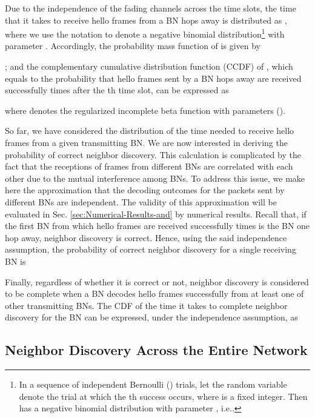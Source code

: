\documentclass[10pt,english,two column]{IEEEtran}
\begin{document}
Due to the independence of the fading channels across the time slots,
the time  that it takes to receive  hello frames from
a BN  hops away is distributed as ,
where we use the notation  to denote a negative binomial
distribution\footnote{In a sequence of independent Bernoulli () trials, let the random
variable  denote the trial at which the th success occurs,
where  is a fixed integer. Then  has a negative binomial distribution
\cite{Morris} with parameter , i.e.. } with parameter . Accordingly, the probability mass function
of  is given by \cite{Morris} 

; and the complementary cumulative
distribution function (CCDF) of , which equals to the probability
that hello frames sent by a BN  hops away are received successfully
 times after the th time slot, can be expressed as \cite{Morris}

where  denotes the regularized incomplete beta function
with parameters ().

So far, we have considered the distribution of the time needed to
receive  hello frames from a given transmitting BN. We are
now interested in deriving the probability  of correct
neighbor discovery. This calculation is complicated by the fact that
the receptions of frames from different BNs are correlated with each
other due to the mutual interference among BNs. To address this issue,
we make here the approximation that the decoding outcomes for the
packets sent by different BNs are independent. The validity of this
approximation will be evaluated in Sec. \ref{sec:Numerical-Results-and}
by numerical results. Recall that, if the first BN from which hello
frames are received successfully  times is the BN one hop
away, neighbor discovery is correct. Hence, using the said independence
assumption, the probability of correct neighbor discovery for a single
receiving BN is 

Finally, regardless of whether it is correct or not, neighbor discovery
is considered to be complete when a BN decodes  hello frames
successfully from at least one of other transmitting BNs. The CDF
of the time it takes to complete neighbor discovery for the BN 
can be expressed, under the independence assumption, as 




\subsection{Neighbor Discovery Across the Entire Network\label{par:ND noInter allBNs}}
\end{document}
